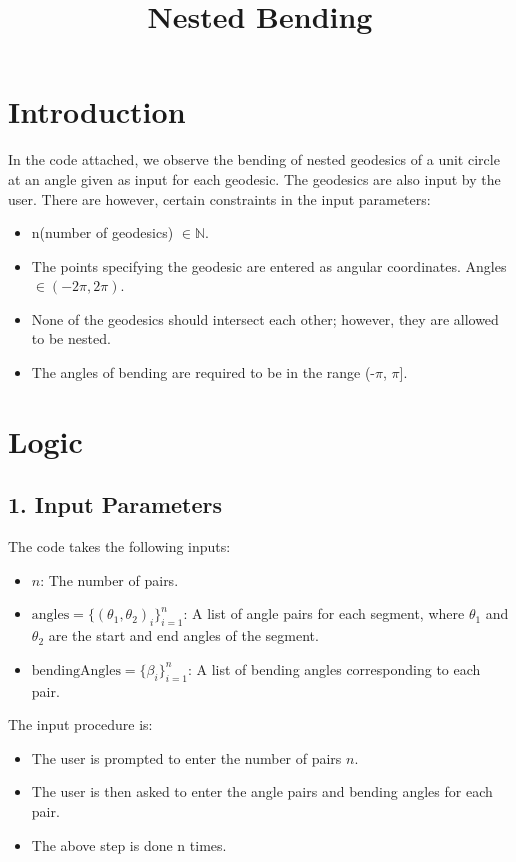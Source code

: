 \documentclass[a4paper,12pt]{article}
\begin{document}
\title{Nested Bending}
\author{}
\date{}
\maketitle

\section*{Introduction}
In the code attached, we observe the bending of nested geodesics of a unit circle at an angle given as input for each geodesic.
The geodesics are also input by the user. There are however, certain constraints in the input parameters:
\begin{itemize}
    \item n(number of geodesics) $\in \mathbb{N}$.
    \item The points specifying the geodesic are entered as angular coordinates. Angles $\in (-2\pi, 2\pi)$.
    \item None of the geodesics should intersect each other; however, they are allowed to be nested.
    \item The angles of bending are required to be in the range (-$\pi$, $\pi$].
\end{itemize}

\section*{Logic}

\subsection*{1. Input Parameters}
The code takes the following inputs:
\begin{itemize}
    \item \( n \): The number of pairs.
    \item \( \text{angles} = \{(\theta_1, \theta_2)_i \}_{i=1}^n \): A list of angle pairs for each segment, where \( \theta_1 \) and \( \theta_2 \) are the start and end angles of the segment.
    \item \( \text{bendingAngles} = \{ \beta_i \}_{i=1}^n \): A list of bending angles corresponding to each pair.
\end{itemize}

The input procedure is:
\begin{itemize}
    \item The user is prompted to enter the number of pairs \( n \).
    \item The user is then asked to enter the angle pairs and bending angles for each pair.
    \item The above step is done n times.
\end{itemize}
\end{document}
